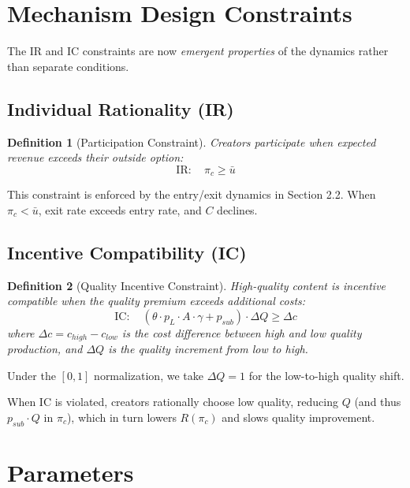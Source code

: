\documentclass[11pt,a4paper]{article}
\newtheorem{definition}{Definition}
\begin{document}
\section{Mechanism Design Constraints}

The IR and IC constraints are now \emph{emergent properties} of the dynamics rather than separate conditions.

\subsection{Individual Rationality (IR)}

\begin{definition}[Participation Constraint]
Creators participate when expected revenue exceeds their outside option:
\begin{equation}
\text{IR}: \quad \pi_c \geq \bar{u}
\end{equation}
\end{definition}

This constraint is enforced by the entry/exit dynamics in Section 2.2. When $\pi_c < \bar{u}$, exit rate exceeds entry rate, and $C$ declines.

\subsection{Incentive Compatibility (IC)}

\begin{definition}[Quality Incentive Constraint]
High-quality content is incentive compatible when the quality premium exceeds additional costs:
\begin{equation}
\text{IC}: \quad (\theta \cdot p_L \cdot A \cdot \gamma + p_{sub}) \cdot \Delta Q \geq \Delta c
\end{equation}
where $\Delta c = c_{high} - c_{low}$ is the cost difference between high and low quality production, and $\Delta Q$ is the quality increment from low to high.
\end{definition}

Under the $[0,1]$ normalization, we take $\Delta Q = 1$ for the low-to-high quality shift.

When IC is violated, creators rationally choose low quality, reducing $Q$ (and thus $p_{sub} \cdot Q$ in $\pi_c$), which in turn lowers $R(\pi_c)$ and slows quality improvement.

\section{Parameters}
\end{document}
